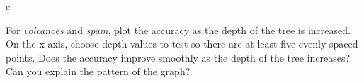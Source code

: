 \documentclass[fleqn]{homework}
\begin{document}
  \begin{problem}{c}
    \begin{question}
      For \textit{volcanoes} and \textit{spam}, plot the accuracy as the depth
      of the tree is increased. On the x-axis, choose depth values to test so
      there are at least five evenly spaced points. Does the accuracy improve
      smoothly as the depth of the tree increases? Can you explain the pattern
      of the graph?
    \end{question}
  \end{problem}
\end{document}
